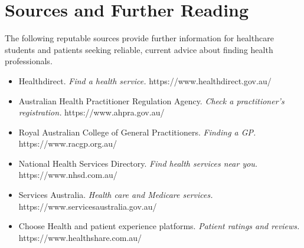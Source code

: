 \section*{Sources and Further Reading}
The following reputable sources provide further information for healthcare students and patients seeking reliable, current advice about finding health professionals.

\begin{itemize}
    \item Healthdirect. \textit{Find a health service.} https://www.healthdirect.gov.au/
    \item Australian Health Practitioner Regulation Agency. \textit{Check a practitioner's registration.} https://www.ahpra.gov.au/
    \item Royal Australian College of General Practitioners. \textit{Finding a GP.} https://www.racgp.org.au/
    \item National Health Services Directory. \textit{Find health services near you.} https://www.nhsd.com.au/
    \item Services Australia. \textit{Health care and Medicare services.} https://www.servicesaustralia.gov.au/
    \item Choose Health and patient experience platforms. \textit{Patient ratings and reviews.} https://www.healthshare.com.au/
\end{itemize}
